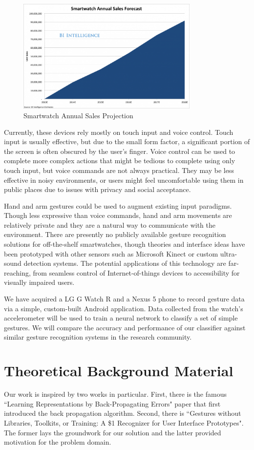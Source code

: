 \documentclass{report}
\begin{document}
\begin{figure}[ht!]
  \label{smartwatch}
  \centering
  \includegraphics[width=90mm]{smartwatch.png}
  \caption{Smartwatch Annual Sales Projection \label{overflow}}
\end{figure}

Currently, these devices rely mostly on touch input and voice control. Touch input is usually effective, but due to the small form factor, a significant portion of the screen is often obscured by the user's finger. Voice control can be used to complete more complex actions that might be tedious to complete using only touch input, but voice commands are not always practical. They may be less effective in noisy environments, or users might feel uncomfortable using them in public places due to issues with privacy and social acceptance.

Hand and arm gestures could be used to augment existing input paradigms. Though less expressive than voice commands, hand and arm movements are relatively private and they are a natural way to communicate with the environment. There are presently no publicly available gesture recognition solutions for off-the-shelf smartwatches, though theories and interface ideas have been prototyped with other sensors such as Microsoft Kinect or custom ultra-sound detection systems. The potential applications of this technology are far-reaching, from seamless control of Internet-of-things devices to accessibility for visually impaired users.

We have acquired a LG G Watch R and a Nexus 5 phone to record gesture data via a simple, custom-built Android application. Data collected from the watch's accelerometer will be used to train a neural network to classify a set of simple gestures. We will compare the accuracy and performance of our classifier against similar gesture recognition systems in the research community.

\chapter{Theoretical Background Material}
Our work is inspired by two works in particular. First, there is the famous ``Learning Representations by Back-Propagating Errors" paper that first introduced the back propagation algorithm. Second, there is ``Gestures without Libraries, Toolkits, or Training: A \$1 Recognizer for User Interface Prototypes". The former lays the groundwork for our solution and the latter provided motivation for the problem domain.
\end{document}
